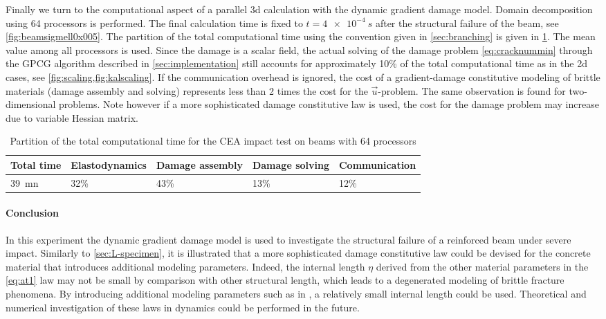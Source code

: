 Finally we turn to the computational aspect of a parallel 3d calculation with the dynamic gradient damage model. Domain decomposition using 64 processors is performed. The final calculation time is fixed to $t=\SI{4e-4}{s}$ after the structural failure of the beam, see \cref{fig:beamsigmell0x005}. The partition of the total computational time using the convention given in \cref{sec:branching} is given in \cref{tab:partimebeam}. The mean value among all processors is used. Since the damage is a scalar field, the actual solving of the damage problem \eqref{eq:cracknummin} through the GPCG algorithm described in \cref{sec:implementation} still accounts for approximately 10\% of the total computational time as in the 2d cases, see \cref{fig:scaling,fig:kalscaling}. If the communication overhead is ignored, the cost of a gradient-damage constitutive modeling of brittle materials (damage assembly and solving) represents less than 2 times the cost for the $\vec{u}$-problem. The same observation is found for two-dimensional problems. Note however if a more sophisticated damage constitutive law is used, the cost for the damage problem may increase due to variable Hessian matrix.
\begin{table}[htbp]
\centering
\caption{Partition of the total computational time for the CEA impact test on beams with 64 processors} \label{tab:partimebeam}
\begin{tabular}{lllll} \toprule
Total time & Elastodynamics & Damage assembly & Damage solving & Communication \\ \midrule
\SI{39}{mn} & 32\% & 43\% & 13\% & 12\% \\ \bottomrule
\end{tabular}
\end{table}

\paragraph*{Conclusion}
In this experiment the dynamic gradient damage model is used to investigate the structural failure of a reinforced beam under severe impact. Similarly to \cref{sec:L-specimen}, it is illustrated that a more sophisticated damage constitutive law could be devised for the concrete material that introduces additional modeling parameters. Indeed, the internal length $\eta$ derived from the other material parameters in the \eqref{eq:at1} law may not be small by comparison with other structural length, which leads to a degenerated modeling of brittle fracture phenomena. By introducing additional modeling parameters such as in \cite{LorentzCuvilliezKazymyrenko:2011,AlessiMarigoVidoli:2015}, a relatively small internal length could be used. Theoretical and numerical investigation of these laws in dynamics could be performed in the future.

